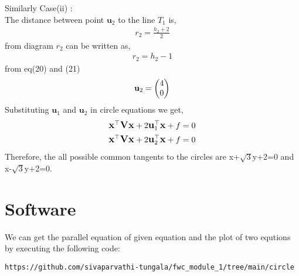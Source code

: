 Similarly Case(ii) : \\
The distance between point $\textbf{u}_{2}$ to the line $T_1$ is,
\begin{align}
r_2=\frac{h_2+2}{2}
\end{align}
from diagram $r_2$ can be written as,
\begin{align}
r_2=h_2-1
\end{align}
from eq(20) and (21)
\begin{align}
\textbf{u}_{2}=\begin{pmatrix}4\\0\end{pmatrix}
\end{align}
Substituting $\textbf{u}_{1}$ and $\textbf{u}_{2}$ in circle equations we get,
\begin{align}
\large\textbf{x}^\top\textbf{Vx} + 2\textbf{u}_{1}^\top\textbf{x} +f =0 \\
\large\textbf{x}^\top\textbf{Vx} + 2\textbf{u}_{2}^\top\textbf{x} +f =0
 \end{align}
Therefore, the all possible common tangents to the circles are x+$\sqrt{3}$y+2=0 and x-$\sqrt{3}$y+2=0.


\section{Software}
  We can get the parallel equation of given equation and the plot of two equtions by executing the following code:
 \vspace{1mm} 
\begin{lstlisting}
https://github.com/sivaparvathi-tungala/fwc_module_1/tree/main/circle
\end{lstlisting}
